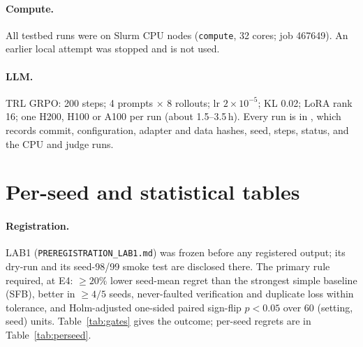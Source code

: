 \paragraph{Compute.} All testbed runs were on Slurm CPU nodes (\texttt{compute}, 32 cores; job 467649). An earlier
local attempt was stopped and is not used.

\paragraph{LLM.} TRL GRPO: 200 steps; 4 prompts $\times$ 8 rollouts; lr $2\times10^{-5}$; KL 0.02; LoRA rank 16; one
H200, H100 or A100 per run (about 1.5--3.5\,h). Every run is in , which records
commit, configuration, adapter and data hashes, seed, steps, status, and the CPU and judge runs.

\section{Per-seed and statistical tables}\label{app2:results}

\paragraph{Registration.} LAB1 (\texttt{PREREGISTRATION\_LAB1.md}) was frozen before any registered output; its
dry-run and its seed-98/99 smoke test are disclosed there. The primary rule required, at E4: $\geq20\%$ lower
seed-mean regret than the strongest simple baseline (SFB), better in $\geq4/5$ seeds, never-faulted verification and
duplicate loss within tolerance, and Holm-adjusted one-sided paired sign-flip $p<0.05$ over 60 (setting, seed)
units. Table~\ref{tab:gates} gives the outcome; per-seed regrets are in Table~\ref{tab:perseed}.

\begin{table}[h]\centering\small
\caption{LAB1 primary tests. H1: adaptive forks vs SFB over \{Dr.~GRPO, RLOO, value baseline, learned Q, PPO\}.
H2: adaptive forks + igc vs SFB including igc. Neither is supported.}\label{tab:gates}\end{table}

\begin{table}[h]\centering\resizebox{\columnwidth}{!}{}
\caption{Exact regret per seed at E4 (25{,}600 episodes; mean over 12 settings $\times$ 3 workflows).}
\label{tab:perseed}\end{table}

